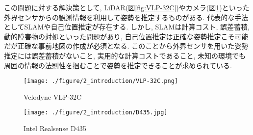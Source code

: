 この問題に対する解決策として, LiDAR(図\ref{fig:VLP-32C})やカメラ(図\ref{fig:D435})といった外界センサからの観測情報を利用して姿勢を推定するものがある. 代表的な手法としてSLAM\cite{thrun2005probabilistic}や自己位置推定が存在する. しかし, SLAMは計算コスト, 誤差蓄積, 動的障害物の対処といった問題があり\cite{SLAM_fail}, 自己位置推定は正確な姿勢推定こそ可能だが正確な事前地図の作成が必須となる. このことから外界センサを用いた姿勢推定には誤差蓄積がないこと, 実用的な計算コストであること, 未知の環境でも周囲の情報の法則性を掴むことで姿勢を推定できることが求められている. \par

\begin{figure}[thpb]
\begin{minipage}[b]{0.5\linewidth}
  \begin{center}
  \texttt{[image: ./figure/2\_introduction/VLP-32C.png]}
  \caption{Velodyne VLP-32C}
  \label{fig:VLP-32C}
  \end{center}
  \end{minipage}
\begin{minipage}[b]{0.5\linewidth}
  \begin{center}
  \texttt{[image: ./figure/2\_introduction/D435.jpg]}
  \caption{Intel Realsense D435}
  \label{fig:D435}
  \end{center}
  \end{minipage}
\end{figure}

